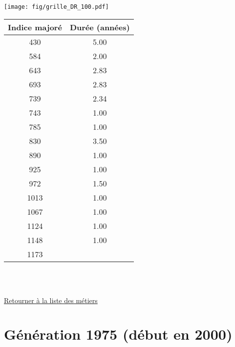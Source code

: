 \begin{minipage}{0.55\linewidth}\texttt{[image: fig/grille\_DR\_100.pdf]}\end{minipage} 
\begin{minipage}{0.3\linewidth} 
 \begin{center} 

\begin{tabular}[htb]{|c|c|} 
\hline 
 Indice majoré &  Durée (années) \\ 
\hline \hline 
 430 &  5.00 \\ 
\hline 
 584 &  2.00 \\ 
\hline 
 643 &  2.83 \\ 
\hline 
 693 &  2.83 \\ 
\hline 
 739 &  2.34 \\ 
\hline 
 743 &  1.00 \\ 
\hline 
 785 &  1.00 \\ 
\hline 
 830 &  3.50 \\ 
\hline 
 890 &  1.00 \\ 
\hline 
 925 &  1.00 \\ 
\hline 
 972 &  1.50 \\ 
\hline 
 1013 &  1.00 \\ 
\hline 
 1067 &  1.00 \\ 
\hline 
 1124 &  1.00 \\ 
\hline 
 1148 &  1.00 \\ 
\hline 
 1173 &   \\ 
\hline 
\hline 
\end{tabular} 
\end{center} 
 \end{minipage} 

~\\ 
 


   
 \localtableofcontents 

~\\ 
 
 \hyperlink{page.2}{\noindent Retourner à la liste des métiers}

 \newpage 

\section{Génération 1975 (début en 2000)\label{DR_100_1975_25_0}} 
 
